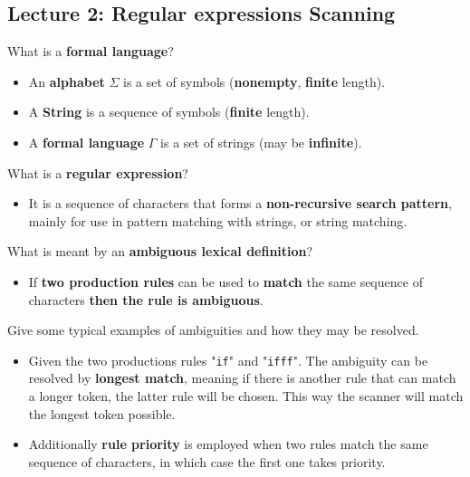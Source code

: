 \documentclass[11pt]{beamer}
\begin{document}
\subsection{Lecture 2: Regular expressions Scanning}
\begin{frame}

\begin{block}{What is a \textbf{formal language}?}
\begin{itemize}
\item An \textbf{alphabet} $\Sigma$ is a set of symbols (\textbf{nonempty}, \textbf{finite} length).
\item A \textbf{String} is a sequence of symbols (\textbf{finite} length).
\item A \textbf{formal language} $\Gamma$ is a set of strings (may be \textbf{infinite}).
\end{itemize}
\end{block}

\begin{block}{What is a \textbf{regular expression}?}
\begin{itemize}
\item It is a sequence of characters that forms a \textbf{non-recursive search pattern}, mainly for use in pattern matching with strings, or string matching.
\end{itemize}
\end{block}

\begin{block}{What is meant by an \textbf{ambiguous lexical definition}?}
\begin{itemize}
\item If \textbf{two production rules} can be used to \textbf{match} the same sequence of characters \textbf{then the rule is ambiguous}.
\end{itemize}
\end{block}

\end{frame}

\begin{frame}

\begin{block}{Give some typical examples of ambiguities and how they may be resolved.}
\begin{itemize}
\item Given the two productions rules "\texttt{if}" and "\texttt{ifff}". The ambiguity can be resolved by \textbf{longest match}, meaning if there is another rule that can match a longer token, the latter rule will be chosen. This way the scanner will match the longest token possible.
\item Additionally \textbf{rule priority} is employed when two rules match the same sequence of characters, in which case the first one takes priority.
\end{itemize}
\end{block}

\end{frame}
\end{document}
